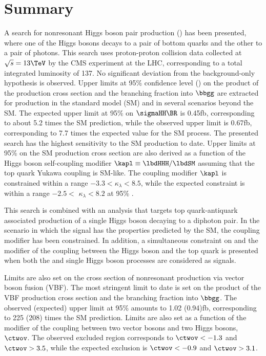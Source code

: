 \documentclass[11pt,a4paper,cmspaper,final,collab]{cms-tdr}
\begin{document}
\section{Summary}\label{sec:sum}

A search for nonresonant Higgs boson pair production (\HH) has been presented, where one of the Higgs bosons decays to a pair of bottom quarks and the other to a pair of photons. This search uses 
proton-proton collision data collected at $\sqrt{s} = 13\TeV$ by the CMS
experiment at the LHC, corresponding to a total integrated luminosity
of 137\fbinv. No significant deviation from the background-only hypothesis is observed.
Upper limits at 95\% confidence level (\CL) on the product of the \HH production cross section and the branching fraction into $\bbgg$ are extracted for production in the standard model
(SM) and in several scenarios beyond the SM. 
The expected upper limit at 95\% \CL on $\sigmaHH \BR$ is 0.45\unit{fb}, corresponding to about 5.2 times the SM prediction, while the observed upper limit is 0.67\unit{fb}, corresponding to 7.7 times the expected value for the SM process. The presented search has the highest sensitivity to the SM \HH production to date. Upper limits at 95\% \CL on the SM \HH production cross section are also derived as a function of the Higgs boson self-coupling modifier $\kapl \equiv \lbdHHH/\lbdSM$ assuming that the top quark Yukawa coupling is SM-like. The coupling modifier $\kapl$ is constrained within a range $-3.3<\kappa_{\lambda}< 8.5$, while the expected constraint is within a range $-2.5<$ $\kappa_{\lambda}<8.2$ at 95\% \CL.


This search is combined with an analysis that targets top quark-antiquark associated production of a single Higgs boson decaying to a diphoton pair.
In the scenario in which the \HH signal has the properties predicted by the SM, the coupling modifier \kapl has been constrained. 
In addition, a simultaneous constraint on \kapl and the modifier of the coupling between the Higgs boson and the top quark \kapt is presented when both the \HH and single Higgs boson processes are considered as signals.

Limits are also set on the cross section of
nonresonant \HH production via vector boson fusion (VBF). 
The most stringent limit to date is set on the product of the \HH VBF production cross section and the branching fraction into $\bbgg$. The observed (expected) upper limit at 95\% \CL amounts to 1.02 (0.94)\unit{fb}, corresponding to 225 (208) times the SM prediction.
Limits are also set as a function of the modifier of the coupling between two vector bosons and two Higgs bosons, $\ctwov$. 
 The observed excluded region
corresponds to $\ctwov < -1.3$ and $\ctwov > 3.5$, while the expected exclusion is $\ctwov < -0.9$ and $\ctwov > 3.1$.
\end{document}
